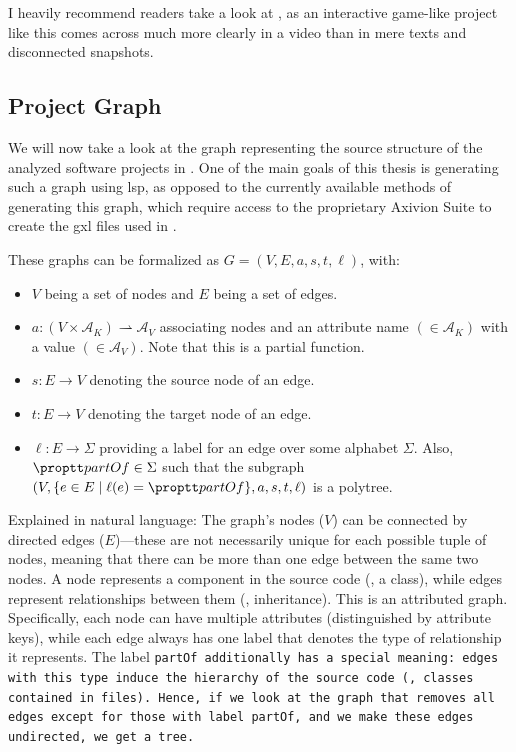 \documentclass[../thesis]{subfiles}
\begin{document}
I heavily recommend readers take a look at , as an interactive game-like project like this comes across much more clearly in a video than in mere texts and disconnected snapshots.

\subsection{Project Graph}\label{subsec:graph}

We will now take a look at the graph representing the source structure of the analyzed software projects in \SEE{}.
One of the main goals of this thesis is generating such a graph using \gls{lsp}, as opposed to the currently available methods of generating this graph, which require access to the proprietary Axivion Suite to create the \gls{gxl} files used in \SEE{}.

These graphs can be formalized as $G = (V, E, a, s, t, \ell)$, with:
\begin{itemize}
	\item $V$ being a set of nodes and $E$ being a set of edges.
	\item $a: (V \times \mathcal{A}_K) \rightharpoonup \mathcal{A}_V$ associating nodes and an attribute name $(\in \mathcal{A}_{K})$ with a value $(\in \mathcal{A}_{V})$. Note that this is a partial function.
	\item $s: E \rightarrow V$ denoting the source node of an edge.
	\item $t: E \rightarrow V$ denoting the target node of an edge.
	\item $\ell: E \rightarrow \Sigma$ providing a label for an edge over some alphabet $\Sigma$.
	      Also, $\tt{partOf} \in \Sigma$ such that the subgraph $(V, \{e \in E \mid \ell(e) = \tt{partOf}\}, a, s, t, \ell)$ is a \gls{polytree}.
\end{itemize}

Explained in natural language:
The graph's nodes ($V$) can be connected by directed edges ($E$)---these are not necessarily unique for each possible tuple of nodes, meaning that there can be more than one edge between the same two nodes.
A node represents a component in the source code (\eg, a class), while edges represent relationships between them (\eg, inheritance).
This is an attributed graph.
Specifically, each node can have multiple attributes (distinguished by attribute keys), while each edge always has one label that denotes the type of relationship it represents.
The label \tt{partOf} additionally has a special meaning: edges with this type induce the hierarchy of the source code (\eg, classes contained in files).
Hence, if we look at the graph that removes all edges except for those with label \tt{partOf}, and we make these edges undirected, we get a tree.
\end{document}
